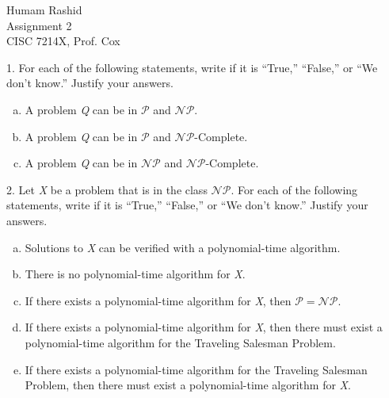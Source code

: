 \documentclass{scrartcl}
\begin{document}
\begin{flushleft}

    Humam Rashid\\
    Assignment 2\\
    CISC 7214X, Prof. Cox\\
    \bigskip

    1. For each of the following statements, write if it is ``True,'' ``False,'' or ``We don't
    know.'' Justify your answers.\\
    \begin{enumerate}[(a)]
        \item A problem \emph{Q} can be in $\mathcal{P}$ and $\mathcal{NP}$.
        \item A problem \emph{Q} can be in $\mathcal{P}$ and $\mathcal{NP}$-Complete.
        \item A problem \emph{Q} can be in $\mathcal{NP}$ and $\mathcal{NP}$-Complete.
    \end{enumerate}
    2. Let \emph{X} be a problem that is in the class $\mathcal{NP}$. For each of the following
    statements, write if it is ``True,'' ``False,'' or ``We don't know.'' Justify your answers.\\
    \begin{enumerate}[(a)]
        \item Solutions to \emph{X} can be verified with a polynomial-time algorithm.
        \item There is no polynomial-time algorithm for \emph{X}.
        \item If there exists a polynomial-time algorithm for \emph{X}, then $\mathcal{P} =
            \mathcal{NP}$.
        \item If there exists a polynomial-time algorithm for \emph{X}, then there must exist a
            polynomial-time algorithm for the Traveling Salesman Problem.
        \item If there exists a polynomial-time algorithm for the Traveling Salesman Problem, then
            there must exist a polynomial-time algorithm for \emph{X}.
    \end{enumerate}

    
\end{flushleft}
\end{document}
